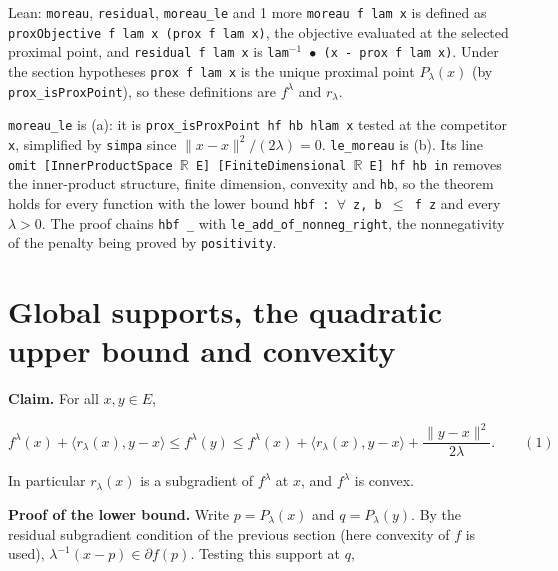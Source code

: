 \documentclass[11pt,a4paper]{article}
\begin{document}
\begin{leanbox}{Lean: \texttt{moreau}, \texttt{residual}, \texttt{moreau\_\allowbreak{}le} and 1 more}
\texttt{moreau f lam x} is defined as \texttt{prox\allowbreak{}Objective f lam x (prox f lam x)}, the objective evaluated at the selected proximal point, and \texttt{residual f lam x} is \texttt{lam\ensuremath{{}^{-1}} \ensuremath{\bullet} (x -\allowbreak{} prox f lam x)}. Under the section hypotheses \texttt{prox f lam x} is the unique proximal point \(P_\lambda(x)\) (by \texttt{prox\_\allowbreak{}is\allowbreak{}Prox\allowbreak{}Point}), so these definitions are \(f^\lambda\) and \(r_\lambda\).




\texttt{moreau\_\allowbreak{}le} is (a): it is \texttt{prox\_\allowbreak{}is\allowbreak{}Prox\allowbreak{}Point hf hb hlam x} tested at the competitor \texttt{x}, simplified by \texttt{simpa} since \(\|x-x\|^2/(2\lambda)=0\). \texttt{le\_\allowbreak{}moreau} is (b). Its line \texttt{omit [Inner\allowbreak{}Product\allowbreak{}Space \ensuremath{\mathbb R} E] [Finite\allowbreak{}Dimensional \ensuremath{\mathbb R} E] hf hb in} removes the inner-product structure, finite dimension, convexity and \texttt{hb}, so the theorem holds for every function with the lower bound \texttt{hbf : \ensuremath{\forall} z, b \ensuremath{\le} f z} and every \(\lambda>0\). The proof chains \texttt{hbf \_\allowbreak{}} with \texttt{le\_\allowbreak{}add\_\allowbreak{}of\_\allowbreak{}nonneg\_\allowbreak{}right}, the nonnegativity of the penalty being proved by \texttt{positivity}.
\end{leanbox}

\section{\texorpdfstring{Global supports, the quadratic upper bound and convexity}{Global supports, the quadratic upper bound and convexity}}


\textbf{Claim.} For all \(x,y\in E\),


\[f^\lambda(x)+\langle r_\lambda(x),y-x\rangle\le f^\lambda(y)\le f^\lambda(x)+\langle r_\lambda(x),y-x\rangle+\frac{\|y-x\|^2}{2\lambda}.\qquad(1)\]


In particular \(r_\lambda(x)\) is a subgradient of \(f^\lambda\) at \(x\), and \(f^\lambda\) is convex.




\textbf{Proof of the lower bound.} Write \(p=P_\lambda(x)\) and \(q=P_\lambda(y)\). By the residual subgradient condition of the previous section (here convexity of \(f\) is used), \(\lambda^{-1}(x-p)\in\partial f(p)\). Testing this support at \(q\),
\end{document}
